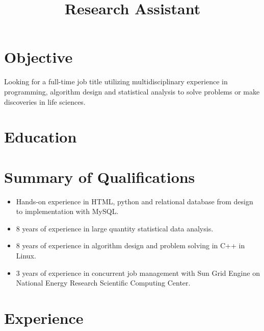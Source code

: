 \documentclass[11pt,letterpaper]{moderncv}
\title{Research Assistant}
\begin{document}
\makecvtitle


\section{Objective}
Looking for a full-time job title utilizing multidisciplinary experience in programming, algorithm design and statistical analysis to solve problems or make discoveries in life sciences.


\section{Education}


\section{Summary of Qualifications}
\begin{itemize}
	\item Hands-on experience in HTML, python and relational database from design to implementation with MySQL.
	\item 8 years of experience in large quantity statistical data analysis.
	\item 8 years of experience in algorithm design and problem solving in C++ in Linux.
	\item 3 years of experience in concurrent job management with Sun Grid Engine on National Energy Research Scientific Computing Center.
\end{itemize}

\section{Experience}
\end{document}
